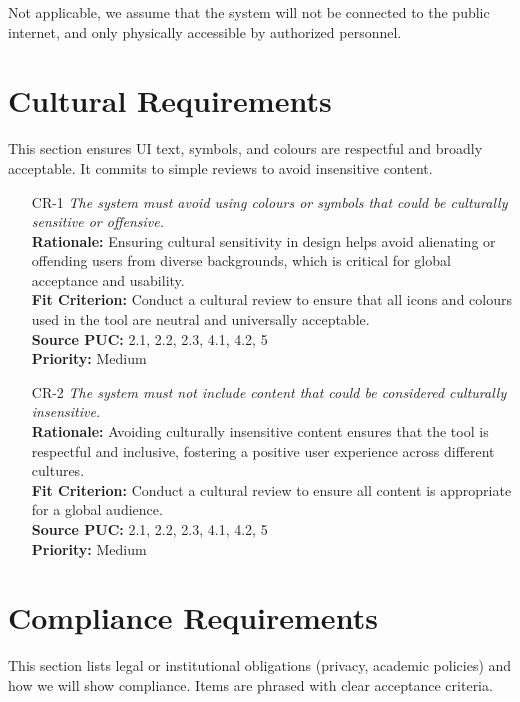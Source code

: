 \documentclass[12pt]{article}
\begin{document}
Not applicable, we assume that the system will not be connected to the public
internet, and only physically accessible by authorized personnel.

\section{Cultural Requirements}
This section ensures UI text, symbols, and colours are respectful and broadly
acceptable. It commits to simple reviews to avoid insensitive content.
\begin{itemize}[leftmargin=*]
  \item[CR-1] \emph{The system must avoid using colours or symbols that could be
          culturally sensitive or offensive.}\\[2mm]
        \textbf{Rationale:} Ensuring cultural sensitivity in design helps avoid alienating or offending users from diverse backgrounds, which is critical for global acceptance and usability.\\
        \textbf{Fit Criterion:} Conduct a cultural review to ensure that all icons and colours used in the tool are neutral and universally acceptable.\\
        \textbf{Source PUC:} 2.1, 2.2, 2.3, 4.1, 4.2, 5 \\
        \textbf{Priority:} Medium

  \item[CR-2] \emph{The system must not include content that could be considered
          culturally insensitive.}\\[2mm]
        \textbf{Rationale:} Avoiding culturally insensitive content ensures that the tool is respectful and inclusive, fostering a positive user experience across different cultures.\\
        \textbf{Fit Criterion:} Conduct a cultural review to ensure all content is appropriate for a global audience.\\
        \textbf{Source PUC:} 2.1, 2.2, 2.3, 4.1, 4.2, 5 \\
        \textbf{Priority:} Medium
\end{itemize}

\section{Compliance Requirements}
This section lists legal or institutional obligations (privacy, academic
policies) and how we will show compliance. Items are phrased with clear
acceptance criteria.
\end{document}
